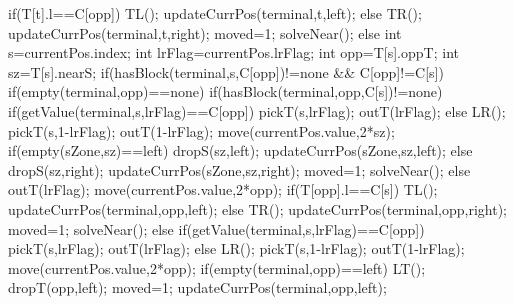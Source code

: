 {{{            if(T[t].l==C[opp])
            {
                TL();
                updateCurrPos(terminal,t,left);
            }
            else
            {
                TR();
                updateCurrPos(terminal,t,right);
            }
            moved=1;
        }
        solveNear();
    }
    else
    {
        int s=currentPos.index;
        int lrFlag=currentPos.lrFlag;
        int opp=T[s].oppT;
        int sz=T[s].nearS;
        if(hasBlock(terminal,s,C[opp])!=none && C[opp]!=C[s])
        {
            if(empty(terminal,opp)==none)
            {
                if(hasBlock(terminal,opp,C[s])!=none)
                {
                    if(getValue(terminal,s,lrFlag)==C[opp])
                    {
                        pickT(s,lrFlag);
                        outT(lrFlag);
                    }
                    else
                    {
                        LR();
                        pickT(s,1-lrFlag);
                        outT(1-lrFlag);
                    }
                    move(currentPos.value,2*sz);
                    if(empty(sZone,sz)==left)
                    {
                        dropS(sz,left);
                        updateCurrPos(sZone,sz,left);
                    }
                    else
                    {
                        dropS(sz,right);
                        updateCurrPos(sZone,sz,right);
                    }
                    moved=1;
                    solveNear();
                }
                else
                {
                    outT(lrFlag);
                    move(currentPos.value,2*opp);
                    if(T[opp].l==C[s])
                    {
                        TL();
                        updateCurrPos(terminal,opp,left);
                    }
                    else
                    {
                        TR();
                        updateCurrPos(terminal,opp,right);
                    }
                    moved=1;
                    solveNear();
                }
            }
            else
            {
                if(getValue(terminal,s,lrFlag)==C[opp])
                {
                    pickT(s,lrFlag);
                    outT(lrFlag);
                }
                else
                {
                    LR();
                    pickT(s,1-lrFlag);
                    outT(1-lrFlag);
                }
                move(currentPos.value,2*opp);
                if(empty(terminal,opp)==left)
                {
                    LT();
                    dropT(opp,left);
                    moved=1;
                    updateCurrPos(terminal,opp,left);
}}}}}
